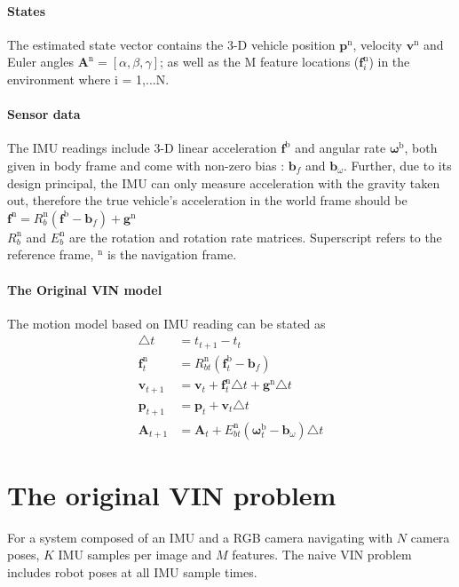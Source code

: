 \documentclass[12pt]{article}   %
\begin{document}
\paragraph{States}
The estimated state vector contains the 3-D vehicle position $\bm{p}^{\mathrm{n}}$, velocity $\bm{v}^{\mathrm{n}}$ and Euler angles $\bm{A}^{\mathrm{n}}=[\alpha,\beta,\gamma]$; as well as the M feature locations ($\bm{f}_i^{\mathrm{n}}$) in the environment where i = 1,...N. 
\paragraph{Sensor data}
The IMU readings include 3-D linear acceleration $\bm{f}^{\mathrm{b}}$ and angular rate $\bm{\omega}^{\mathrm{b}}$, both given in body frame and come with non-zero bias : $\bm{b}_f$ and $\bm{b}_\omega$. \newline
Further, due to its design principal, the IMU can only measure acceleration with the gravity taken out, therefore the true vehicle's acceleration in the world frame should be \\
$\bm{f}^{\mathrm{n}} = R_b^{\mathrm{n}}( \bm{f}^{\mathrm{b}}-\bm{b}_f ) + \bm{g}^{\mathrm{n}}$ \\
$R_b^{\mathrm{n}}$ and $E_b^{\mathrm{n}}$ are the rotation and rotation rate matrices.
Superscript refers to the reference frame, ${}^{\mathrm{n}}$ is the navigation frame.

\paragraph{The Original VIN model}
The motion model based on IMU reading can be stated as
\begin{align*}
	\triangle t & =  t_{t+1} - t_t \\
	\bm{f}_t^{\mathrm{n}} & = R_{bt}^{\mathrm{n}}  (\bm{f}_t^{\mathrm{b}} - \bm{b}_f) \\
	\bm{v}_{t+1} & = \bm{v}_{t} + \bm{f}_t^{\mathrm{n}} \triangle t + \bm{g}^{\mathrm{n}} \triangle t \\
	\bm{p}_{t+1} & = \bm{p}_{t} + \bm{v}_t \triangle t \\
	\bm{A}_{t+1} & = \bm{A}_t + E_{bt}^{\mathrm{n}}  (\bm{\omega}_t^{\mathrm{b}} - \bm{b}_\omega) \triangle t
\end{align*}

\section{The original VIN problem}
For a system composed of an IMU and a RGB camera navigating with $N$ camera poses, $K$ IMU samples per image and $M$ features. The naive VIN problem includes robot poses at all IMU sample times.
\end{document}
